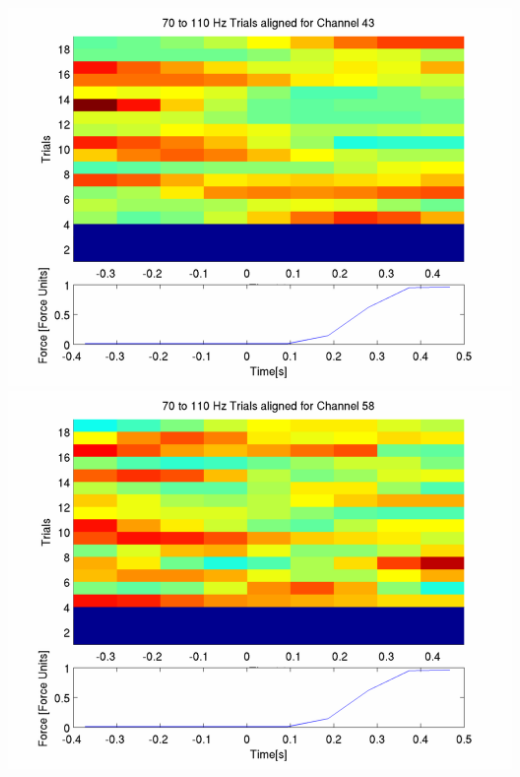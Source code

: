 \documentclass[12pt]{article}
\begin{document}
\includegraphics[scale=0.2]{plot_5_aligned_trials.png}
\includegraphics[scale=0.2]{plot_6_aligned_trials.png}
\end{document}
